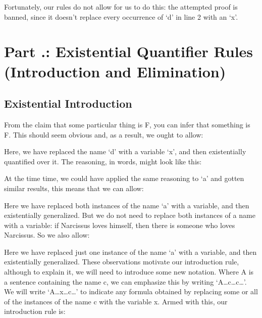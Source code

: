 Fortunately, our rules do not allow for us to do this: the attempted proof is banned, since it doesn’t replace every occurrence of ‘d’ in line 2 with an ‘x’.
\section{Part \thechapcount.\theseccount: Existential Quantifier Rules (Introduction and Elimination)}
\subsection{Existential Introduction}

From the claim that some particular thing is F, you can infer that something is F. This should seem obvious and, as a result, we ought to allow:
\begin{fitchproof}
\end{fitchproof}

Here, we have replaced the name ‘d’ with a variable ‘x’, and then existentially quantified over it. The reasoning, in words, might look like this:


At the time time, we could have applied the same reasoning to ‘a' and gotten similar results, this means that we can allow:
\begin{fitchproof}
\end{fitchproof}

Here we have replaced both instances of the name ‘a’ with a variable, and then existentially generalized. But we do not need to replace both instances of a name with a variable: if Narcissus loves himself, then there is someone who loves Narcissus. So we also allow:
\begin{fitchproof}
\end{fitchproof}

Here we have replaced just one instance of the name ‘a’ with a variable, and then existentially generalized. These observations motivate our introduction rule, although to explain it, we will need to introduce some new notation. Where A is a sentence containing the name c, we can emphasize this by writing ‘A\ldots c\ldots c\ldots ’. We will write ‘A\ldots x\ldots c\ldots ’ to indicate any formula obtained by replacing some or all of the instances of the name c with the variable x. Armed with this, our introduction rule is:

